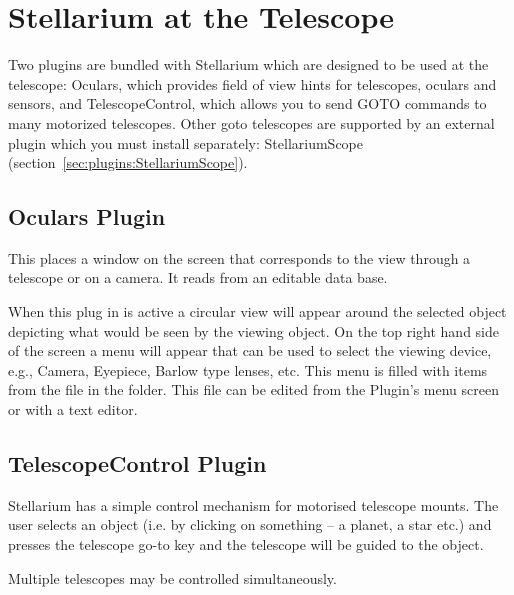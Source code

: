
\chapter{Stellarium at the Telescope}
\label{ch:atTheTelescope}

Two plugins are bundled with Stellarium which are designed to be used
at the telescope: Oculars, which provides field of view hints for
telescopes, oculars and sensors, and TelescopeControl, which allows
you to send GOTO commands to many motorized telescopes. Other goto
telescopes are supported by an external plugin which you must install
separately: StellariumScope (section~\ref{sec:plugins:StellariumScope}). 

\section{Oculars Plugin}
\label{sec:plugins:Oculars}

This places a window on the screen that corresponds to the view
through a telescope or on a camera. It reads from an editable data
base.

When this plug in is active a circular view will appear around the
selected object depicting what would be seen by the viewing object. On
the top right hand side of the screen a menu will appear that can be
used to select the viewing device, e.g., Camera, Eyepiece, Barlow type
lenses, etc. This menu is filled with items from the 
file in the  folder. This file can be edited
from the Plugin's menu screen or with a text editor.


\section{TelescopeControl Plugin}
\label{sec:plugins:TelescopeControl}

Stellarium has a simple control mechanism for motorised telescope
mounts. The user selects an object (i.e. by clicking on something -- a
planet, a star etc.) and presses the telescope go-to key 
and the telescope will be guided to the object.

Multiple telescopes may be controlled simultaneously. 


